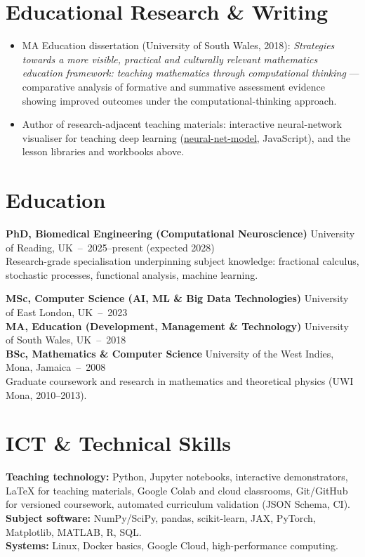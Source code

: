 \documentclass[10pt,a4paper]{article}
\newcommand{\entry}[2]{{\textbf{#1}} \hfill {\small\color{muted}#2}\\[1pt]}
\begin{document}
\section{Educational Research \& Writing}
\begin{itemize}[leftmargin=1.3em,itemsep=2pt,topsep=2pt]
  \item MA Education dissertation (University of South Wales, 2018): \emph{Strategies towards a more visible, practical and culturally relevant mathematics education framework: teaching mathematics through computational thinking} --- comparative analysis of formative and summative assessment evidence showing improved outcomes under the computational-thinking approach.
  \item Author of research-adjacent teaching materials: interactive neural-network visualiser for teaching deep learning (\href{https://github.com/dave2k77/neural-net-model}{neural-net-model}, JavaScript), and the lesson libraries and workbooks above.
\end{itemize}

\section{Education}
\entry{PhD, Biomedical Engineering (Computational Neuroscience)}{University of Reading, UK \,--\, 2025--present (expected 2028)}
Research-grade specialisation underpinning subject knowledge: fractional calculus, stochastic processes, functional analysis, machine learning.

\entry{MSc, Computer Science (AI, ML \& Big Data Technologies)}{University of East London, UK \,--\, 2023}
\entry{MA, Education (Development, Management \& Technology)}{University of South Wales, UK \,--\, 2018}
\entry{BSc, Mathematics \& Computer Science}{University of the West Indies, Mona, Jamaica \,--\, 2008}
{\small Graduate coursework and research in mathematics and theoretical physics (UWI Mona, 2010--2013).}

\newpage %
\section{ICT \& Technical Skills}
\textbf{Teaching technology:} Python, Jupyter notebooks, interactive demonstrators, LaTeX for teaching materials, Google Colab and cloud classrooms, Git/GitHub for versioned coursework, automated curriculum validation (JSON Schema, CI).\\
\textbf{Subject software:} NumPy/SciPy, pandas, scikit-learn, JAX, PyTorch, Matplotlib, MATLAB, R, SQL.\\
\textbf{Systems:} Linux, Docker basics, Google Cloud, high-performance computing.
\end{document}
